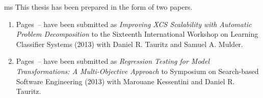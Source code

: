 \begin{ThesisPublicationOption}{ms}
This thesis has been prepared in the form of two papers.

\renewcommand{\theenumi}{Paper \arabic{enumi}}
\begin{enumerate}%

\item Pages~\pageref{paper:1_start}--\pageref{paper:1_end} have been submitted as 
  \textit{Improving XCS Scalability with Automatic Problem Decomposition} to the Sixteenth International Workshop on
Learning Classifier Systems (2013) with Daniel R. Tauritz and Samuel A. Mulder.

\item Pages~\pageref{paper:2_start}--\pageref{paper:2_end} have been submitted as 
  \textit{Regression Testing for Model Transformations: A Multi-Objective Approach} to Symposium on Search-based Software Engineering (2013) with Marouane Kessentini and Daniel R. Tauritz.
\end{enumerate}
\renewcommand{\theenumi}{\arabic{enumi}}


\end{ThesisPublicationOption}
